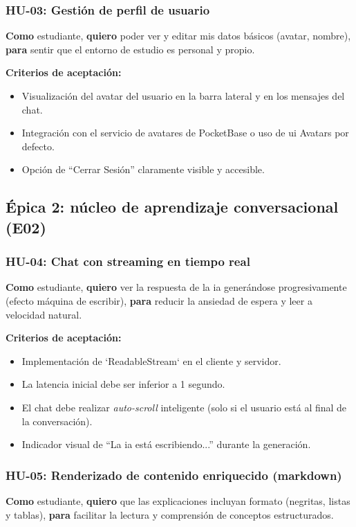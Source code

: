 \subsubsection{HU-03: Gestión de perfil de usuario}
\textbf{Como} estudiante,
\textbf{quiero} poder ver y editar mis datos básicos (avatar, nombre),
\textbf{para} sentir que el entorno de estudio es personal y propio.

\textbf{Criterios de aceptación:}
\begin{itemize}
\item Visualización del avatar del usuario en la barra lateral y en los mensajes del chat.
\item Integración con el servicio de avatares de PocketBase o uso de \gls{ui} Avatars por defecto.
\item Opción de \enquote{Cerrar Sesión} claramente visible y accesible.
\end{itemize}

\subsection{Épica 2: núcleo de aprendizaje conversacional (E02)}

\subsubsection{HU-04: Chat con streaming en tiempo real}
\textbf{Como} estudiante,
\textbf{quiero} ver la respuesta de la \gls{ia} generándose progresivamente (efecto máquina de escribir),
\textbf{para} reducir la ansiedad de espera y leer a velocidad natural.

\textbf{Criterios de aceptación:}
\begin{itemize}
\item Implementación de `ReadableStream` en el cliente y servidor.
\item La latencia inicial debe ser inferior a 1 segundo.
\item El chat debe realizar \textit{auto-scroll} inteligente (solo si el usuario está al final de la conversación).
\item Indicador visual de \enquote{La \gls{ia} está escribiendo...} durante la generación.
\end{itemize}

\subsubsection{HU-05: Renderizado de contenido enriquecido (markdown)}
\textbf{Como} estudiante,
\textbf{quiero} que las explicaciones incluyan formato (negritas, listas y tablas),
\textbf{para} facilitar la lectura y comprensión de conceptos estructurados.

